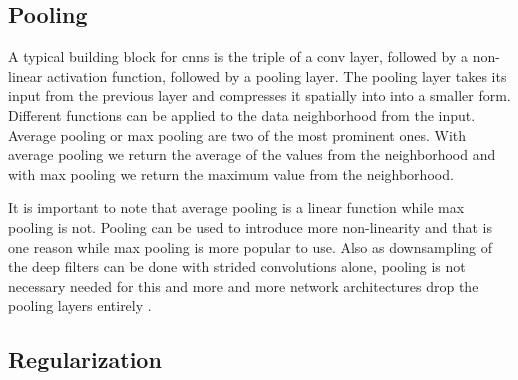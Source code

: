 \subsection{Pooling}
\label{sub:concepts:nn:pooling}
A typical building block for \glspl{cnn} is the triple of a \gls{conv} layer, followed by a non-linear activation function, followed by a pooling layer. The pooling layer takes its input from the previous layer and compresses it spatially into into a smaller form. Different functions can be applied to the data neighborhood from the input. Average pooling \citep{lecun_handwritten_1990} or max pooling \citep{zhou_computation_1988} are two of the most prominent ones. With average pooling we return the average of the values from the neighborhood and with max pooling we return the maximum value from the neighborhood.

It is important to note that average pooling is a linear function while max pooling is not. Pooling can be used to introduce more non-linearity and that is one reason while max pooling is more popular to use. Also as downsampling of the deep filters can be done with strided convolutions alone, pooling is not necessary needed for this and more and more network architectures drop the pooling layers entirely \citep{springenberg_striving_2014}.

\subsection{Regularization} %
\label{sub:conepts:nn:regularization}


